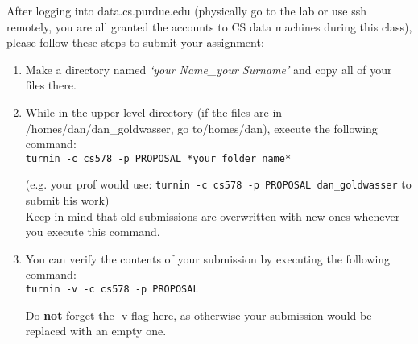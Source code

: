 \documentclass[11pt]{article}
\begin{document}
After logging into data.cs.purdue.edu (physically go to the lab or use ssh remotely, you are all granted the accounts to CS data machines during this class), please follow these steps to submit your assignment:
\begin{enumerate}
	\item Make a directory named \textit{`your Name\_your Surname'} and copy all of your files there.
	\item While in the upper level directory (if the files are in /homes/dan/dan\_goldwasser, go to/homes/dan), execute the following command:\\

	\texttt{turnin -c cs578 -p PROPOSAL *your\_folder\_name*}
		
	(e.g. your prof would use: \texttt{turnin -c cs578 -p PROPOSAL dan\_goldwasser} to submit his work)\\
		
	Keep in mind that old submissions are overwritten with new ones whenever you execute this
command.\\

	\item You can verify the contents of your submission by executing the following command:\\
	
	\texttt{turnin -v -c cs578 -p PROPOSAL\\}

	Do \textbf{not} forget the -v flag here, as otherwise your submission would be replaced with an empty
one.
\end{enumerate}

%
%
\end{document}
